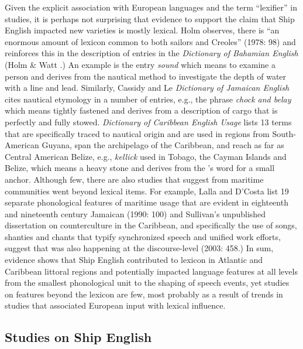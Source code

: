   Given the explicit association with  European languages and the term “lexifier” in  studies, it is perhaps not surprising that evidence to support the claim that Ship English impacted new varieties is mostly lexical. Holm observes, there is “an enormous amount of lexicon common to both sailors and Creoles” (1978: 98) and reinforces this in the description of entries in the \textit{Dictionary of Bahamian English} (Holm \& Watt \citealt{Schilling1982}.) An example is the entry \textit{sound} which means to examine a person and derives from the nautical method to investigate the depth of water with a line and lead. Similarly, Cassidy and Le  \textit{Dictionary of Jamaican English} cites nautical etymology in a number of entries, e.g., the phrase \textit{chock and belay} which means tightly fastened and derives from a description of cargo that is perfectly and fully stowed.  \textit{Dictionary of Caribbean English Usage} lists 13 terms that are specifically traced to nautical origin and are used in regions from South-American Guyana, span the archipelago of the Caribbean, and reach as far as Central American Belize, e.g., \textit{kellick} used in Tobago, the Cayman Islands and Belize, which means a heavy stone and derives from the ’s word for a small anchor. Although few, there are also studies that suggest  from maritime communities went beyond lexical items. For example, Lalla and D’Costa list 19 separate phonological features of maritime usage that are evident in eighteenth and nineteenth century Jamaican  (1990: 100) and Sullivan’s unpublished dissertation on  counterculture in the Caribbean, and specifically the use of songs, shanties and chants that typify synchronized speech and unified work efforts, suggest that  was also happening at the discourse-level (2003: 458.) In sum, evidence shows that Ship English contributed to lexicon in Atlantic and Caribbean littoral regions and potentially impacted language features at all levels from the smallest phonological unit to the shaping of speech events, yet studies on features beyond the lexicon are few, most probably as a result of trends in  studies that associated European input with lexical influence.  

\subsection{{Studies} {on} {Ship} {English}}%

